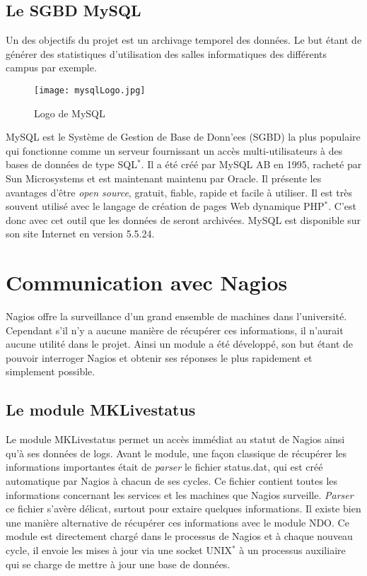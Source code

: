 \subsection{Le SGBD MySQL}

Un des objectifs du projet {\YuukouII} est un archivage temporel des donn\'ees.
Le but \'etant de g\'en\'erer des statistiques d'utilisation des salles informatiques des diff\'erents campus par exemple.

\begin{figure}[!ht]
	\centering
	\texttt{[image: mysqlLogo.jpg]}
	\caption{Logo de MySQL}
	
\end{figure}

MySQL est le Syst\`eme de Gestion de Base de Donn'ees (SGBD) la plus populaire qui fonctionne comme un serveur fournissant un acc\`es multi-utilisateurs \`a des bases de donn\'ees de type SQL$^*$.
Il a \'et\'e cr\'e\'e par MySQL AB en 1995, rachet\'e par Sun Microsystems et est maintenant maintenu par Oracle.
Il pr\'esente les avantages d'\^etre \textit{open source}, gratuit, fiable, rapide et facile \`a utiliser.
Il est tr\`es souvent utilis\'e avec le langage de cr\'eation de pages Web dynamique PHP$^*$.
C'est donc avec cet outil que les donn\'ees de {\YuukouII} seront archiv\'ees.
MySQL est disponible sur son site Internet\cite{biblio:siteMySQL} en version 5.5.24.



\section{Communication avec Nagios}

Nagios offre la surveillance d'un grand ensemble de machines dans l'universit\'e. 
Cependant s'il n'y a aucune mani\`ere de r\'ecup\'erer ces informations, il n'aurait aucune utilit\'e dans le projet.
Ainsi un module a \'et\'e d\'evelopp\'e, son but \'etant de pouvoir interroger Nagios et obtenir ses r\'eponses le plus rapidement et simplement possible.

\subsection{Le module MKLivestatus}
\label{section:moduleMKLivestatus}

Le module MKLivestatus permet un acc\`es imm\'ediat au statut de Nagios ainsi qu'\`a ses donn\'ees de logs.
Avant le module, une fa\c{c}on classique de r\'ecup\'erer les informations importantes \'etait de \textit{parser} le fichier \textsf{status.dat}, qui est cr\'e\'e automatique par Nagios \`a chacun de ses cycles.
Ce fichier contient toutes les informations concernant les services et les machines que Nagios surveille.
\textit{Parser} ce fichier s'av\`ere d\'elicat, surtout pour extaire quelques informations.
Il existe bien une mani\`ere alternative de r\'ecup\'erer ces informations avec le module NDO.
Ce module est directement charg\'e dans le processus de Nagios et \`a chaque nouveau cycle, il envoie les mises \`a jour via une socket UNIX$^*$ \`a un processus auxiliaire qui se charge de mettre \`a jour une base de donn\'ees.


